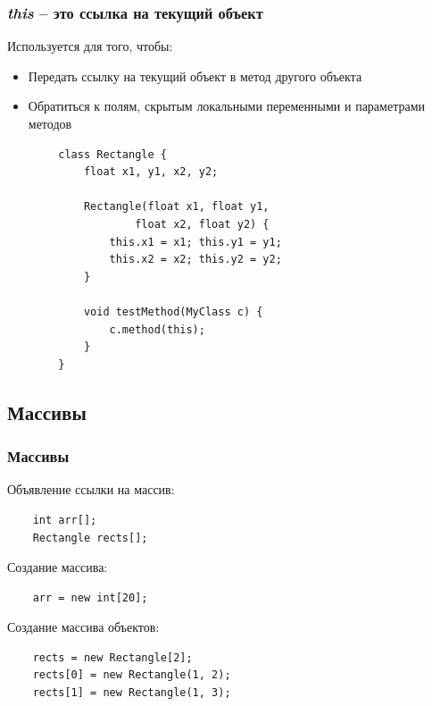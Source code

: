 \begin{frame}[fragile]
	\frametitle{\textit{this} -- это ссылка на текущий объект}

	\begin{large}
	Используется для того, чтобы:
	\begin{itemize}
	\item{Передать ссылку на текущий объект в метод другого объекта}
	\item{Обратиться к полям, скрытым локальными переменными и параметрами методов}
	\end{itemize}
	\end{large}

	\begin{verbatim}
		class Rectangle {
		    float x1, y1, x2, y2;

		    Rectangle(float x1, float y1,
		            float x2, float y2) {
		        this.x1 = x1; this.y1 = y1;
		        this.x2 = x2; this.y2 = y2;
		    }
		
		    void testMethod(MyClass c) {
		        c.method(this);
		    }
		}
	\end{verbatim}
\end{frame}

\subsection{Массивы}
\begin{frame}[fragile]
	\frametitle{Массивы}

	\begin{Large}
	Объявление ссылки на массив:
	\begin{verbatim}
	int arr[];
	Rectangle rects[];
	\end{verbatim}

	Создание массива:
	\begin{verbatim}
	arr = new int[20];
	\end{verbatim}

	Создание массива объектов:
	\begin{verbatim}
	rects = new Rectangle[2];
	rects[0] = new Rectangle(1, 2);
	rects[1] = new Rectangle(1, 3);
	\end{verbatim}
	\end{Large}
\end{frame}

